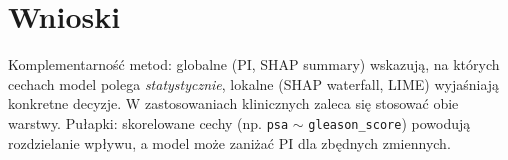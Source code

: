 \documentclass[12pt,a4paper]{article}
\begin{document}
\section{Wnioski}
Komplementarność metod: globalne (PI, SHAP summary) wskazują, na których cechach model polega \textit{statystycznie}, lokalne (SHAP waterfall, LIME) wyjaśniają konkretne decyzje. W zastosowaniach klinicznych zaleca się stosować obie warstwy. Pułapki: skorelowane cechy (np. \texttt{psa} $\sim$ \texttt{gleason\_score}) powodują rozdzielanie wpływu, a model może zaniżać PI dla zbędnych zmiennych.
\end{document}
